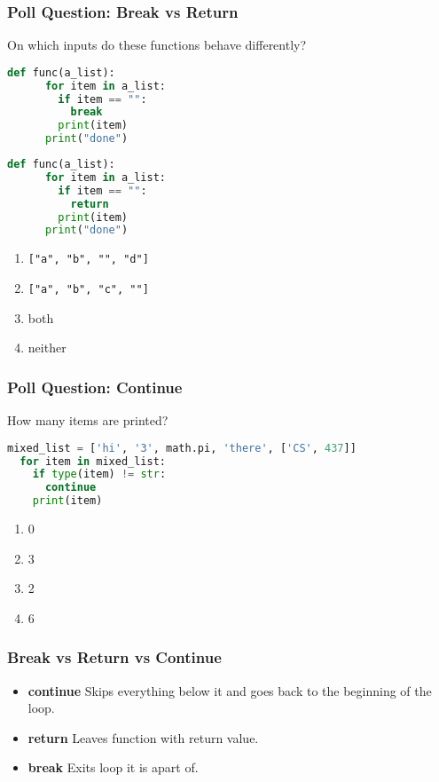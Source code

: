 \documentclass{beamer}
\begin{document}
%
%
\begin{frame}[fragile]
  \frametitle{Poll Question: Break vs Return}
  On which inputs do these functions behave differently?
  \centering
  \begin{minipage}{0.45\textwidth}
    \begin{lstlisting}[language=Python, autogobble]
    def func(a_list):
      for item in a_list:
        if item == "":
          break
        print(item)
      print("done")
    \end{lstlisting}
  \end{minipage}
  \hfill
  \begin{minipage}{0.45\textwidth}
    \begin{lstlisting}[language=Python, autogobble]
    def func(a_list):
      for item in a_list:
        if item == "":
          return 
        print(item)
      print("done")
    \end{lstlisting}
  \end{minipage}
  \vfill
  \begin{enumerate}[A]
    \item \lstinline|["a", "b", "", "d"]|
    \item \lstinline|["a", "b", "c", ""]|
    \item both
    \item neither
  \end{enumerate}
\end{frame}

%
%
\begin{frame}[fragile]
  \frametitle{Poll Question: Continue}
  How many items are printed?
  \begin{lstlisting}[language=Python, autogobble]
  mixed_list = ['hi', '3', math.pi, 'there', ['CS', 437]]
  for item in mixed_list:
    if type(item) != str:
      continue
    print(item)
  \end{lstlisting}
  \vfill
  \begin{enumerate}[A]
    \item 0
    \item 3
    \item 2
    \item 6
  \end{enumerate}
\end{frame}

%
%
\begin{frame}[fragile]
  \frametitle{Break vs Return vs Continue}
  \begin{itemize}
    \item \textbf{continue} \textrightarrow Skips everything below it and goes back to the beginning of the loop.
    \item \textbf{return} \textrightarrow Leaves function with return value.
    \item \textbf{break} \textrightarrow Exits loop it is apart of.
    \end{itemize}
\end{frame}
\end{document}
